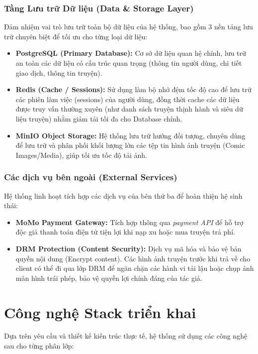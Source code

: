 \subsubsection{Tầng Lưu trữ Dữ liệu (Data \& Storage Layer)}
Đảm nhiệm vai trò lưu trữ toàn bộ dữ liệu của hệ thống, bao gồm 3 nền tảng lưu trữ chuyên biệt để tối ưu cho từng loại dữ liệu:
\begin{itemize}
    \item \textbf{PostgreSQL (Primary Database):} Cơ sở dữ liệu quan hệ chính, lưu trữ an toàn các dữ liệu có cấu trúc quan trọng (thông tin người dùng, chi tiết giao dịch, thông tin truyện).
    \item \textbf{Redis (Cache / Sessions):} Sử dụng làm bộ nhớ đệm tốc độ cao để lưu trữ các phiên làm việc (sessions) của người dùng, đồng thời cache các dữ liệu được truy vấn thường xuyên (như danh sách truyện thịnh hành và siêu dữ liệu truyện) nhằm giảm tải tối đa cho Database chính.
    \item \textbf{MinIO Object Storage:} Hệ thống lưu trữ hướng đối tượng, chuyên dùng để lưu trữ và phân phối khối lượng lớn các tệp tin hình ảnh truyện (Comic Images/Media), giúp tối ưu tốc độ tải ảnh.
\end{itemize}

\subsubsection{Các dịch vụ bên ngoài (External Services)}
Hệ thống linh hoạt tích hợp các dịch vụ của bên thứ ba để hoàn thiện hệ sinh thái:
\begin{itemize}
    \item \textbf{MoMo Payment Gateway:} Tích hợp thông qua \textit{payment API} để hỗ trợ độc giả thanh toán điện tử tiện lợi khi nạp xu hoặc mua truyện trả phí.
    \item \textbf{DRM Protection (Content Security):} Dịch vụ mã hóa và bảo vệ bản quyền nội dung (Encrypt content). Các hình ảnh truyện trước khi trả về cho client có thể đi qua lớp DRM để ngăn chặn các hành vi tải lậu hoặc chụp ảnh màn hình trái phép, bảo vệ quyền lợi chính đáng của tác giả.
\end{itemize}

\section{Công nghệ Stack triển khai}

Dựa trên yêu cầu và thiết kế kiến trúc thực tế, hệ thống sử dụng các công nghệ sau cho từng phân lớp:

